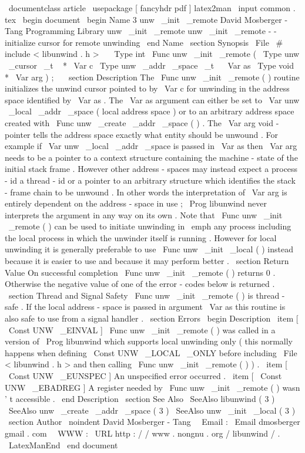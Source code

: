 \
documentclass
{
article
}
\
usepackage
[
fancyhdr
pdf
]
{
latex2man
}
\
input
{
common
.
tex
}
\
begin
{
document
}
\
begin
{
Name
}
{
3
}
{
unw
\
_init
\
_remote
}
{
David
Mosberger
-
Tang
}
{
Programming
Library
}
{
unw
\
_init
\
_remote
}
unw
\
_init
\
_remote
-
-
initialize
cursor
for
remote
unwinding
\
end
{
Name
}
\
section
{
Synopsis
}
\
File
{
\
#
include
<
libunwind
.
h
>
}
\
\
\
Type
{
int
}
\
Func
{
unw
\
_init
\
_remote
}
(
\
Type
{
unw
\
_cursor
\
_t
~
*
}
\
Var
{
c
}
\
Type
{
unw
\
_addr
\
_space
\
_t
~
}
\
Var
{
as
}
\
Type
{
void
~
*
}
\
Var
{
arg
}
)
;
\
\
\
section
{
Description
}
The
\
Func
{
unw
\
_init
\
_remote
}
(
)
routine
initializes
the
unwind
cursor
pointed
to
by
\
Var
{
c
}
for
unwinding
in
the
address
space
identified
by
\
Var
{
as
}
.
The
\
Var
{
as
}
argument
can
either
be
set
to
\
Var
{
unw
\
_local
\
_addr
\
_space
}
(
local
address
space
)
or
to
an
arbitrary
address
space
created
with
\
Func
{
unw
\
_create
\
_addr
\
_space
}
(
)
.
The
\
Var
{
arg
}
void
-
pointer
tells
the
address
space
exactly
what
entity
should
be
unwound
.
For
example
if
\
Var
{
unw
\
_local
\
_addr
\
_space
}
is
passed
in
\
Var
{
as
}
then
\
Var
{
arg
}
needs
to
be
a
pointer
to
a
context
structure
containing
the
machine
-
state
of
the
initial
stack
frame
.
However
other
address
-
spaces
may
instead
expect
a
process
-
id
a
thread
-
id
or
a
pointer
to
an
arbitrary
structure
which
identifies
the
stack
-
frame
chain
to
be
unwound
.
In
other
words
the
interpretation
of
\
Var
{
arg
}
is
entirely
dependent
on
the
address
-
space
in
use
;
\
Prog
{
libunwind
}
never
interprets
the
argument
in
any
way
on
its
own
.
Note
that
\
Func
{
unw
\
_init
\
_remote
}
(
)
can
be
used
to
initiate
unwinding
in
\
emph
{
any
}
process
including
the
local
process
in
which
the
unwinder
itself
is
running
.
However
for
local
unwinding
it
is
generally
preferable
to
use
\
Func
{
unw
\
_init
\
_local
}
(
)
instead
because
it
is
easier
to
use
and
because
it
may
perform
better
.
\
section
{
Return
Value
}
On
successful
completion
\
Func
{
unw
\
_init
\
_remote
}
(
)
returns
0
.
Otherwise
the
negative
value
of
one
of
the
error
-
codes
below
is
returned
.
\
section
{
Thread
and
Signal
Safety
}
\
Func
{
unw
\
_init
\
_remote
}
(
)
is
thread
-
safe
.
If
the
local
address
-
space
is
passed
in
argument
\
Var
{
as
}
this
routine
is
also
safe
to
use
from
a
signal
handler
.
\
section
{
Errors
}
\
begin
{
Description
}
\
item
[
\
Const
{
UNW
\
_EINVAL
}
]
\
Func
{
unw
\
_init
\
_remote
}
(
)
was
called
in
a
version
of
\
Prog
{
libunwind
}
which
supports
local
unwinding
only
(
this
normally
happens
when
defining
\
Const
{
UNW
\
_LOCAL
\
_ONLY
}
before
including
\
File
{
<
libunwind
.
h
>
}
and
then
calling
\
Func
{
unw
\
_init
\
_remote
}
(
)
)
.
\
item
[
\
Const
{
UNW
\
_EUNSPEC
}
]
An
unspecified
error
occurred
.
\
item
[
\
Const
{
UNW
\
_EBADREG
}
]
A
register
needed
by
\
Func
{
unw
\
_init
\
_remote
}
(
)
wasn
'
t
accessible
.
\
end
{
Description
}
\
section
{
See
Also
}
\
SeeAlso
{
libunwind
(
3
)
}
\
SeeAlso
{
unw
\
_create
\
_addr
\
_space
(
3
)
}
\
SeeAlso
{
unw
\
_init
\
_local
(
3
)
}
\
section
{
Author
}
\
noindent
David
Mosberger
-
Tang
\
\
Email
:
\
Email
{
dmosberger
gmail
.
com
}
\
\
WWW
:
\
URL
{
http
:
/
/
www
.
nongnu
.
org
/
libunwind
/
}
.
\
LatexManEnd
\
end
{
document
}

